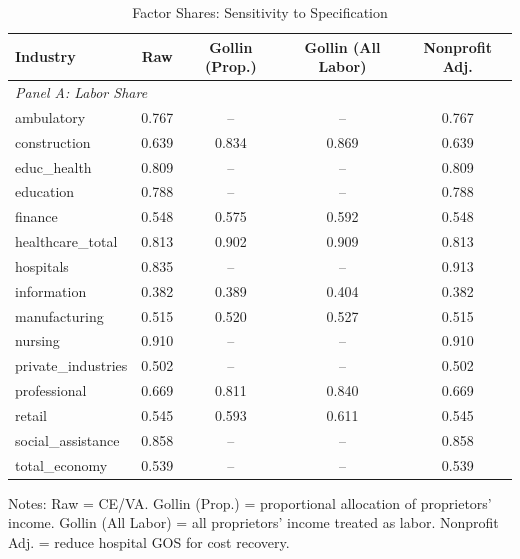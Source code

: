 \begin{table}[htbp]
\centering
\caption{Factor Shares: Sensitivity to Specification}
\label{tab:sensitivity}
\begin{tabular}{lcccc}
\toprule
Industry & Raw & Gollin (Prop.) & Gollin (All Labor) & Nonprofit Adj. \\
\midrule
\multicolumn{5}{l}{\textit{Panel A: Labor Share}} \\
ambulatory  & 0.767 & -- & -- & 0.767 \\
construction  & 0.639 & 0.834 & 0.869 & 0.639 \\
educ_health  & 0.809 & -- & -- & 0.809 \\
education  & 0.788 & -- & -- & 0.788 \\
finance  & 0.548 & 0.575 & 0.592 & 0.548 \\
healthcare_total  & 0.813 & 0.902 & 0.909 & 0.813 \\
hospitals  & 0.835 & -- & -- & 0.913 \\
information  & 0.382 & 0.389 & 0.404 & 0.382 \\
manufacturing  & 0.515 & 0.520 & 0.527 & 0.515 \\
nursing  & 0.910 & -- & -- & 0.910 \\
private_industries  & 0.502 & -- & -- & 0.502 \\
professional  & 0.669 & 0.811 & 0.840 & 0.669 \\
retail  & 0.545 & 0.593 & 0.611 & 0.545 \\
social_assistance  & 0.858 & -- & -- & 0.858 \\
total_economy  & 0.539 & -- & -- & 0.539 \\
\bottomrule
\end{tabular}
\begin{tablenotes}
\small
\item Notes: Raw = CE/VA. Gollin (Prop.) = proportional allocation of proprietors' income. 
Gollin (All Labor) = all proprietors' income treated as labor. 
Nonprofit Adj. = reduce hospital GOS for cost recovery.
\end{tablenotes}
\end{table}
